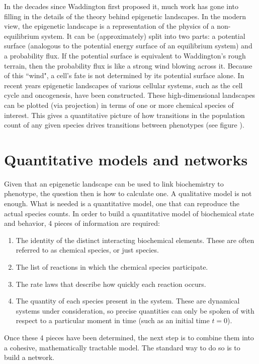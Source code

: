In the decades since Waddington first proposed it, much work has gone into filling in the details of the theory behind epigenetic landscapes. In the modern view\supercite{Xu:2016dw,Wu:2014gf,Wu:2013dx}, the epigenetic landscape is a representation of the physics of a non-equilibrium system. It can be (approximately) split into two parts: a potential surface (analogous to the potential energy surface of an equilibrium system) and a probability flux. If the potential surface is equivalent to Waddington's rough terrain, then the probability flux is like a strong wind blowing across it. Because of this ``wind", a cell's fate is not determined by its potential surface alone. In recent years epigenetic landscapes of various cellular systems, such as the cell cycle\supercite{Li:2014iw,Luo:2017iw} and oncogenesis\supercite{Li:2014ho,ArandaAnzaldo:2018bf}, have been constructed. These high-dimensional landscapes can be plotted (via projection) in terms of one or more chemical species of interest. This gives a quantitative picture of how transitions in the population count of any given species drives transitions between phenotypes (see figure ).

\section{Quantitative models and networks}
\label{sec:quant_models}

Given that an epigenetic landscape can be used to link biochemistry to phenotype, the question then is how to calculate one. A qualitative model is not enough. What is needed is a quantitative model, one that can reproduce the actual species counts. In order to build a quantitative model of biochemical state and behavior, 4 pieces of information are required:
\begin{enumerate}
    \item\label{item:species} The identity of the distinct interacting biochemical elements. These are often referred to as chemical species, or just species.
    \item The list of reactions in which the chemical species participate.
    \item The rate laws that describe how quickly each reaction occurs. 
    \item The quantity of each species present in the system. These are dynamical systems under consideration, so precise quantities can only be spoken of with respect to a particular moment in time (such as an initial time $t=0$).
\end{enumerate}
Once these 4 pieces have been determined, the next step is to combine them into a cohesive, mathematically tractable model. The standard way to do so is to build a network.

